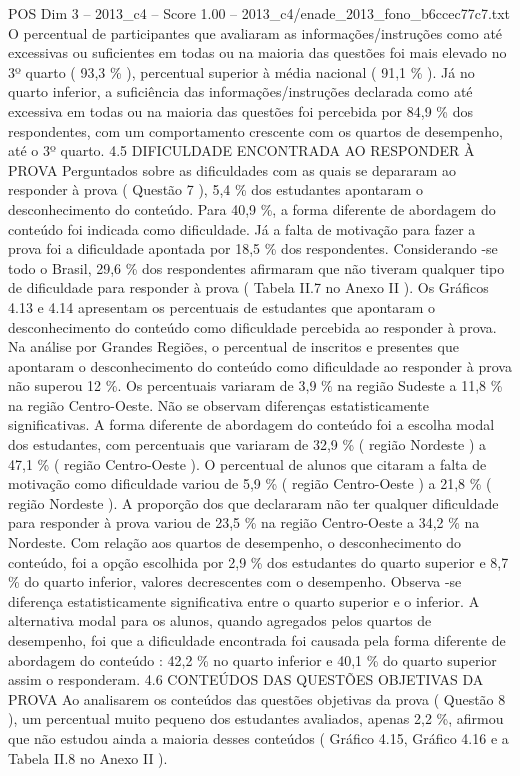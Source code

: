 \begin{textsample}{POS Dim 3 – 2013\_c4 – Score 1.00 – 2013\_c4/enade\_2013\_fono\_b6ccec77c7.txt}
O percentual de participantes que avaliaram as informações/instruções como até excessivas ou suficientes em todas ou na maioria das questões foi mais elevado no 3º quarto ( 93,3 \% ), percentual superior à média nacional ( 91,1 \% ).
Já no quarto inferior, a suficiência das informações/instruções declarada como até excessiva em todas ou na maioria das questões foi percebida por 84,9 \% dos respondentes, com um comportamento crescente com os quartos de desempenho, até o 3º quarto. 4.5 DIFICULDADE ENCONTRADA AO RESPONDER À PROVA Perguntados sobre as dificuldades com as quais se depararam ao responder à prova ( Questão 7 ), 5,4 \% dos estudantes apontaram o desconhecimento do conteúdo.
Para 40,9 \%, a forma diferente de abordagem do conteúdo foi indicada como dificuldade.
Já a falta de motivação para fazer a prova foi a dificuldade apontada por 18,5 \% dos respondentes.
Considerando -se todo o Brasil, 29,6 \% dos respondentes afirmaram que não tiveram qualquer tipo de dificuldade para responder à prova ( Tabela II.7 no Anexo II ).
Os Gráficos 4.13 e 4.14 apresentam os percentuais de estudantes que apontaram o desconhecimento do conteúdo como dificuldade percebida ao responder à prova.
Na análise por Grandes Regiões, o percentual de inscritos e presentes que apontaram o desconhecimento do conteúdo como dificuldade ao responder à prova não superou 12 \%.
Os percentuais variaram de 3,9 \% na região Sudeste a 11,8 \% na região Centro-Oeste.
Não se observam diferenças estatisticamente significativas.
A forma diferente de abordagem do conteúdo foi a escolha modal dos estudantes, com percentuais que variaram de 32,9 \% ( região Nordeste ) a 47,1 \% ( região Centro-Oeste ).
O percentual de alunos que citaram a falta de motivação como dificuldade variou de 5,9 \% ( região Centro-Oeste ) a 21,8 \% ( região Nordeste ).
A proporção dos que declararam não ter qualquer dificuldade para responder à prova variou de 23,5 \% na região Centro-Oeste a 34,2 \% na Nordeste.
Com relação aos quartos de desempenho, o desconhecimento do conteúdo, foi a opção escolhida por 2,9 \% dos estudantes do quarto superior e 8,7 \% do quarto inferior, valores decrescentes com o desempenho.
Observa -se diferença estatisticamente significativa entre o quarto superior e o inferior.
A alternativa modal para os alunos, quando agregados pelos quartos de desempenho, foi que a dificuldade encontrada foi causada pela forma diferente de abordagem do conteúdo : 42,2 \% no quarto inferior e 40,1 \% do quarto superior assim o responderam. 4.6 CONTEÚDOS DAS QUESTÕES OBJETIVAS DA PROVA Ao analisarem os conteúdos das questões objetivas da prova ( Questão 8 ), um percentual muito pequeno dos estudantes avaliados, apenas 2,2 \%, afirmou que não estudou ainda a maioria desses conteúdos ( Gráfico 4.15, Gráfico 4.16 e a Tabela II.8 no Anexo II ).

\end{textsample}
